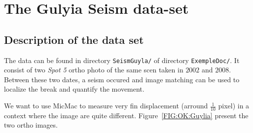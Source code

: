 


\section{The Gulyia Seism data-set}

\subsection{Description of the data set}

The data can be found in directory {\tt SeismGuyla/} of directory {\tt ExempleDoc/}.
It consist of  two \emph{Spot 5} ortho photo of the same scen taken in $2002$ and
$2008$. Between these two dates, a seism occured and image matching can be used to
localize the break and quantify the movement.

We want to use MicMac to measure very fin displacement (arround $\frac{1}{10}$ pixel) in
a context where the image are quite different. Figure~\ref{FIG:OK:Guylia} present the two
ortho images.

